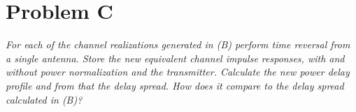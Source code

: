 \section{Problem C}
\textit{For each of the channel realizations generated in (B) perform time reversal from a single antenna. Store the new equivalent channel impulse responses, with and without power normalization and the transmitter. Calculate the new power delay profile and from that the delay spread. How does it compare to the delay spread calculated in (B)?}